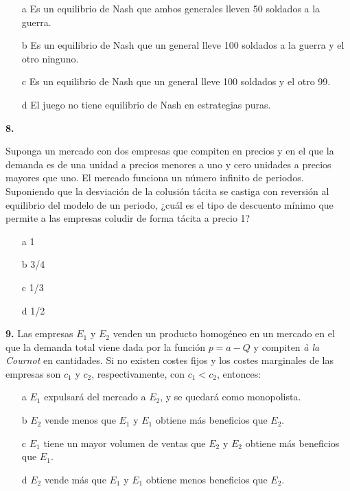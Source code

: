 \documentclass{nuevotema}
\begin{document}
\begin{enumerate}
	\item[a] Es un equilibrio de Nash que ambos generales lleven 50 soldados a la guerra.
	\item[b] Es un equilibrio de Nash que un general lleve 100 soldados a la guerra y el otro ninguno.
	\item[c] Es un equilibrio de Nash que un general lleve 100 soldados y el otro 99.
	\item[d] El juego no tiene equilibrio de Nash en estrategias puras.
\end{enumerate}

\textbf{8.}

Suponga un mercado con dos empresas que compiten en precios y en el que la demanda es de una unidad a precios menores a uno y cero unidades a precios mayores que uno. El mercado funciona un número infinito de periodos. Suponiendo que la desviación de la colusión tácita se castiga con reversión al equilibrio del modelo de un periodo, ¿cuál es el tipo de descuento mínimo que permite a las empresas coludir de forma tácita a precio 1?

\begin{enumerate} 
	\item[a] 1
	\item[b] 3/4
	\item[c] 1/3
	\item[d] 1/2
\end{enumerate}


\textbf{9.} Las empresas $E_1$ y $E_2$ venden un producto homogéneo en un mercado en el que la demanda total viene dada por la función $p=a - Q$ y compiten \textit{à la Cournot} en cantidades. Si no existen costes fijos y los costes marginales de las empresas son $c_1$ y $c_2$, respectivamente, con $c_1 < c_2$, entonces:

\begin{enumerate}
	\item[a] $E_1$ expulsará del mercado a $E_2$, y se quedará como monopolista.
	\item[b] $E_2$ vende menos que $E_1$ y $E_1$ obtiene más beneficios que $E_2$.
	\item[c] $E_1$ tiene un mayor volumen de ventas que $E_2$ y $E_2$ obtiene más beneficios que $E_1$.
	\item[d] $E_2$ vende más que $E_1$ y $E_1$ obtiene menos beneficios que $E_2$.
\end{enumerate}
\end{document}
